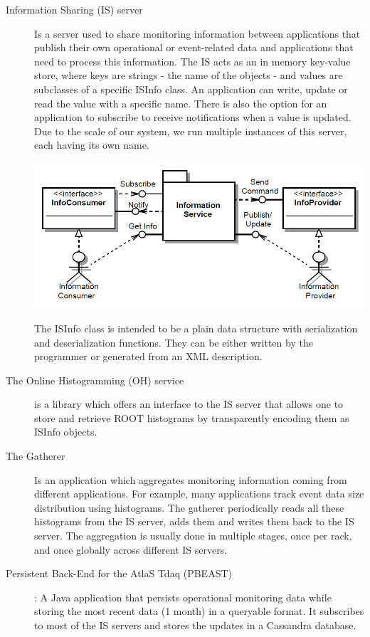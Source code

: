 \begin{description}
\item[Information Sharing (IS) server \citep{kolosinformation}]  Is a server used to share monitoring information between applications that publish their own operational or event-related data and applications that need to process this information. The IS acts as an in memory key-value store, where keys are strings - the name of the objects - and values are subclasses of a specific ISInfo class. An application can write, update or read the value with a specific name. There is also the option for an application to subscribe to receive notifications when a value is updated. Due to the scale of our system, we run multiple instances of this server, each having its own name.

\includegraphics[scale=0.45]{Images/IS.png}

The ISInfo class is intended to be a plain data structure with serialization and deserialization functions. They can be either written by the programmer or generated from an XML description.

\item[The Online Histogramming (OH) service \citep{kolosoh}] is a library which offers an interface to the IS server that allows one to store and retrieve ROOT histograms by transparently encoding them as ISInfo objects.

\item[The Gatherer \citep{renkel2010gatherer}] Is an application which aggregates monitoring information coming from different applications. For example, many applications track event data size distribution using histograms. The gatherer periodically reads all these histograms from the IS server, adds them and writes them back to the IS server. The aggregation is usually done in multiple stages, once per rack, and once globally across different IS servers. 

\item[Persistent Back-End for the AtlaS Tdaq (PBEAST) \citep{sicoe2012persistent}]: A Java application that persists operational monitoring data while storing the most recent data (1 month) in a queryable format. It subscribes to most of the IS servers and stores the updates in a Cassandra database.

\end{description}

